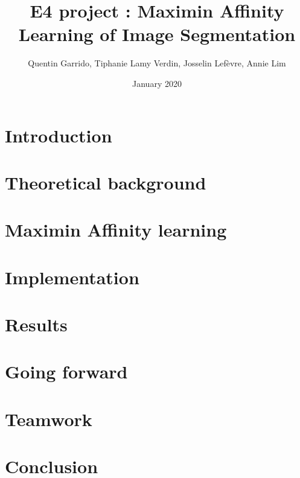 \documentclass{article}
\title{E4 project : Maximin Affinity Learning of Image Segmentation}
\author{Quentin Garrido, Tiphanie Lamy Verdin, Josselin Lefèvre, Annie Lim}
\date{January 2020}
\begin{document}
\maketitle
\pagebreak
\tableofcontents
\pagebreak


\section{Introduction}



\clearpage
\section{Theoretical background}



\clearpage
\section{Maximin Affinity learning}



\clearpage
\section{Implementation}



\clearpage
\section{Results}




\clearpage
\section{Going forward}




\clearpage
\section{Teamwork}



\clearpage
\section{Conclusion}



\pagebreak
\nocite{*}


\end{document}
